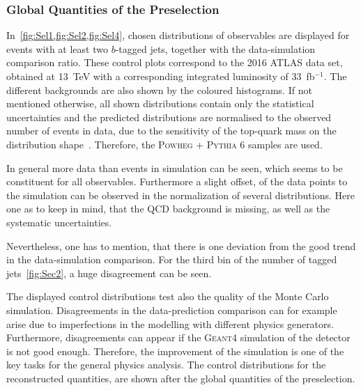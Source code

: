 \subsubsection{Global Quantities of the Preselection}

In~\cref{fig:Sel1,fig:Sel2,fig:Sel4}, chosen distributions of observables are displayed for events with at least two $b$-tagged jets, together with the data-simulation comparison ratio. These control plots correspond to the  2016 ATLAS data set, obtained at 13~TeV with a corresponding integrated luminosity of 33~fb$^{-1}$. The different backgrounds are also shown by the coloured histograms. If not mentioned otherwise, all shown distributions contain only the statistical uncertainties and the  predicted distributions are normalised to the observed number of events in data, due to the sensitivity of the top-quark mass on the distribution shape~\cite{ATLAS-CONF-2017-071}. Therefore, the \textsc{Powheg} + \textsc{Pythia 6} samples are used.

In general more data than events in  simulation can be seen, which seems to be constituent for all observables. Furthermore a slight offset, of the data points to the simulation can be observed in the normalization of several distributions.    
Here one as to keep in mind, that the QCD background is missing, as well as the systematic uncertainties.

Nevertheless, one has to mention, that there is one deviation from the good trend in the data-simulation comparison. For the third bin of the number of tagged jets~\cref{fig:Sec2}, a huge disagreement can be seen.

The displayed control distributions test also the quality of the Monte Carlo simulation.
Disagreements in the data-prediction comparison can for example  arise due to imperfections in the  modelling  with different physics generators. Furthermore, disagreements can appear if the \textsc{Geant4} simulation of the detector is not good enough. Therefore, the improvement of the simulation is one of the key tasks for the general physics analysis. 
The control distributions for the reconstructed quantities, are shown after the global quantities of the preselection.





\clearpage

